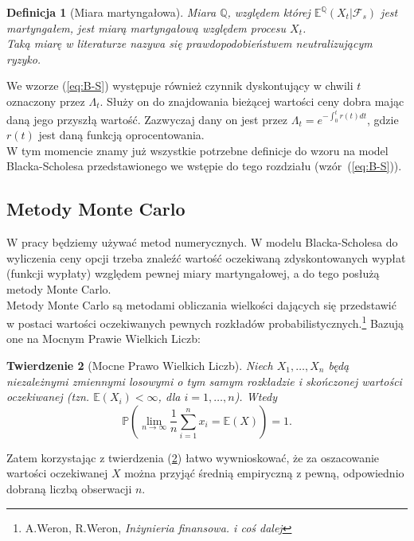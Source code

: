 \documentclass[12pt]{article}
\newtheorem{theorem}{Twierdzenie}
\newtheorem{definition}[theorem]{Definicja}
\begin{document}
\begin{definition}[Miara martyngałowa]
Miara $\mathbb{Q}$, względem której $\mathbb{E}^{\mathbb{Q}}(X_t|\mathcal{F}_s)$ jest martyngałem, jest miarą martyngałową względem procesu $X_t$.\\
Taką miarę w literaturze nazywa się prawdopodobieństwem neutralizującym ryzyko.
\end{definition}
 
We wzorze (\ref{eq:B-S}) występuje również czynnik dyskontujący w chwili $t$ oznaczony przez $\Lambda_t$. Służy on do znajdowania bieżącej wartości ceny dobra mając daną jego przyszłą wartość. Zazwyczaj dany on jest przez $\Lambda_t = e^{-\int_0^tr(t)dt}$, gdzie $r(t)$ jest daną funkcją oprocentowania.\\

\noindent W tym momencie znamy już wszystkie potrzebne definicje do wzoru na model Blacka-Scholesa przedstawionego we wstępie do tego rozdziału (wzór~(\ref{eq:B-S})).
 
 
\subsection{Metody Monte Carlo}

W pracy będziemy używać metod numerycznych. W modelu Blacka-Scholesa do wyliczenia ceny opcji trzeba znaleźć wartość oczekiwaną zdyskontowanych wypłat (funkcji wypłaty) względem pewnej miary martyngałowej, a do tego posłużą metody Monte Carlo.\\

Metody Monte Carlo są metodami obliczania wielkości dających się przedstawić w postaci wartości oczekiwanych pewnych rozkładów probabilistycznych.\footnote{A.Weron, R.Weron, \textit{Inżynieria finansowa. i coś dalej}} Bazują one na Mocnym Prawie Wielkich Liczb:

\begin{theorem}[Mocne Prawo Wielkich Liczb]
\label{th:MPWL}
Niech $X_1,\ldots,X_n$ będą niezależnymi zmiennymi losowymi o tym samym rozkładzie i skończonej wartości oczekiwanej (tzn. $\mathbb{E}(X_i)<\infty$, dla $i=1,\ldots,n$). Wtedy
\begin{equation*}
 \mathbb{P}(\lim_{n\rightarrow \infty}\frac{1}{n}\sum_{i=1}^n x_i = \mathbb{E}(X)) = 1.
\end{equation*}
\end{theorem}
\noindent Zatem korzystając z twierdzenia (\ref{th:MPWL}) łatwo wywnioskować, że za oszacowanie wartości oczekiwanej $X$ można przyjąć średnią empiryczną z pewną, odpowiednio dobraną liczbą obserwacji $n$.
\end{document}
